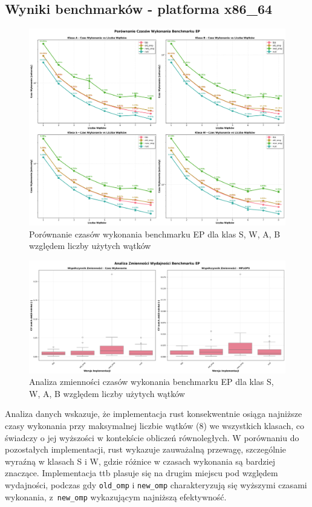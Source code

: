 \subsection{Wyniki benchmarków - platforma x86\_64}
\begin{figure}[H]
    \centering
    \includegraphics[width=\textwidth]{analiza/images/parallel/ep/x86/ep_porownanie_czasow_wykonania.png}
    \caption{Porównanie czasów wykonania benchmarku EP dla klas S, W, A, B względem liczby użytych wątków}
    \label{ep_porownanie_czasow_wykonania_x86_64}
\end{figure}

\begin{figure}[H]
    \centering
    \includegraphics[width=\textwidth]{analiza/images/parallel/ep/x86/ep_analiza_zmiennosci.png}
    \caption{Analiza zmienności czasów wykonania benchmarku EP dla klas S, W, A, B względem liczby użytych wątków}
    \label{ep_analiza_zmiennosci_x86_64}
\end{figure}

Analiza danych wskazuje, że implementacja rust konsekwentnie osiąga najniższe czasy wykonania przy maksymalnej liczbie wątków (8) we wszystkich klasach, co świadczy o jej wyższości w kontekście obliczeń równoległych.
W porównaniu do pozostałych implementacji, rust wykazuje zauważalną przewagę, szczególnie wyraźną w klasach S i W, gdzie różnice w czasach wykonania są bardziej znaczące. Implementacja ttb plasuje się na drugim miejscu pod względem wydajności, podczas gdy \texttt{old\_omp} i \texttt{new\_omp} charakteryzują się wyższymi czasami wykonania, z~\texttt{new\_omp} wykazującym najniższą efektywność.

